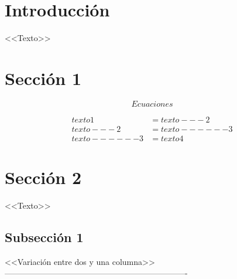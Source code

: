 







\begin{multicols}{2}

\section{Introducción}

<<Texto>>

\section{Sección 1} 

\begin{equation}
    Ecuaciones
\label{ecuacion}
\end{equation}

\begin{equation*} %
\begin{split}
    texto1 & = texto---2 \\
    texto---2 & = texto------3 \\
    texto------3 & = texto4
\end{split}
\end{equation*}

\section{Sección 2}

<<Texto>>

\end{multicols}

\subsection{Subsección 1}

<<Variación entre dos y una columna>> -------------------------------------------------------------------

